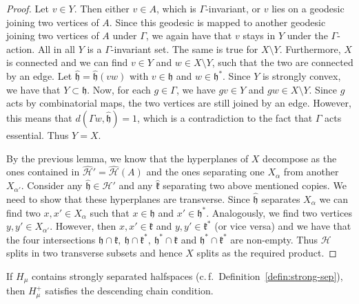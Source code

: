 \begin{proof}
  Let \(v \in Y\). Then either \(v \in A\), which is \(\Gamma\)-invariant, or \(v\) lies on a geodesic joining two vertices of \(A\). Since this geodesic is mapped to another geodesic joining two vertices of \(A\) under \(\Gamma\), we again have that \(v\) stays in \(Y\) under the \(\Gamma\)-action. All in all \(Y\) is a \(\Gamma\)-invariant set. The same is true for \(X \setminus Y\). Furthermore, \(X\) is connected and we can find \(v \in Y\) and \(w \in X \setminus Y\), such that the two are connected by an edge. Let \(\mathfrak{\hat h} = \mathfrak{\hat h}(vw)\) with \(v \in \mathfrak{h}\) and \(w \in \mathfrak{h}^\ast\). Since \(Y\) is strongly convex, we have that \(Y \subset \mathfrak{h}\). Now, for each \(g \in \Gamma\), we have \(gv \in Y\) and \(gw \in X \setminus Y\). Since \(g\) acts by combinatorial maps, the two vertices are still joined by an edge. However, this means that \(d(\Gamma w, \mathfrak{\hat h}) = 1\), which is a contradiction to the fact that \(\Gamma\) acts essential. Thus \(Y = X\).

  By the previous lemma, we know that the hyperplanes of \(X\) decompose as the ones contained in \(\mathcal{\hat H'} = \mathcal{\hat H}(A)\) and the ones separating one \(X_\alpha\) from another \(X_{\alpha'}\). Consider any \(\mathfrak{\hat h} \in \mathcal{\hat H'}\) and any \(\mathfrak{\hat k}\) separating two above mentioned copies. We need to show that these hyperplanes are transverse. Since \(\mathfrak{\hat h}\) separates \(X_\alpha\) we can find two \(x, x' \in X_\alpha\) such that \(x \in \mathfrak{h}\) and \(x' \in \mathfrak{h}^\ast\). Analogously, we find two vertices \(y,y' \in X_{\alpha'}\). However, then \(x,x' \in \mathfrak{k}\) and \(y,y' \in \mathfrak{k}^\ast\) (or vice versa) and we have that the four intersections \(\mathfrak{h} \cap \mathfrak{k},\ \mathfrak{h} \cap \mathfrak{k}^\ast,\ \mathfrak{h}^\ast \cap \mathfrak{k}\) and \(\mathfrak{h}^\ast \cap \mathfrak{k}^\ast\) are non-empty. Thus \(\mathcal{H}\) splits in two transverse subsets and hence \(X\) splits as the required product.
\end{proof}

\begin{lemma}[{\cite[Lemma~4.18]{MR3509968}}]
  \label{lem:4.18}
  If \(H_\mu\) contains strongly separated halfspaces (c.\,f.~Definition~\ref{defin:strong-sep}), then \(H_\mu^+\) satisfies the descending chain condition.
\end{lemma}

